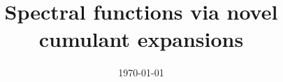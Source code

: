 \documentclass[%
 reprint,
 amsmath,amssymb,
 aps,
]{revtex4-2}
\begin{document}

\title{Spectral functions via novel cumulant expansions}%





\date{\today}%


\end{document}
